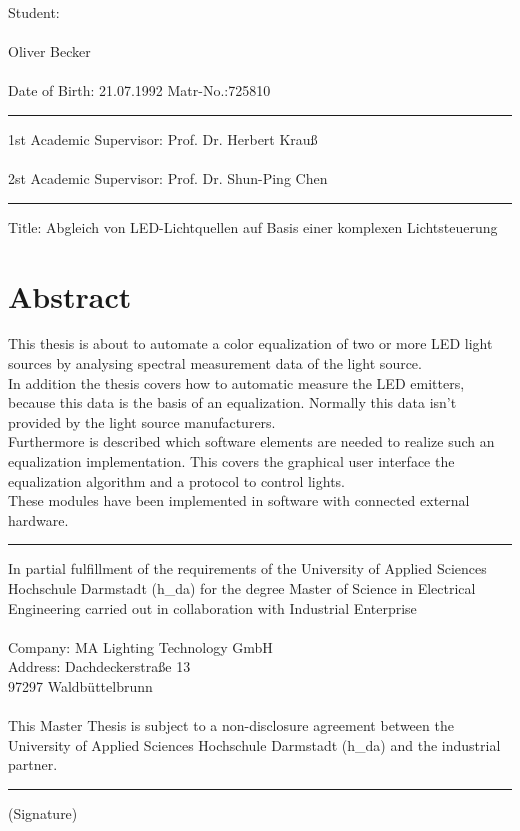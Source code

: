 \documentclass[11pt]{scrartcl}
\begin{document}
\noindent
Student:\\
\\
Oliver \hspace{6cm} Becker\\
\\
Date of Birth: 21.07.1992 \hspace{2.8cm} Matr-No.:725810
\par\noindent\rule{\textwidth}{0.4pt}
1st Academic Supervisor: Prof. Dr. Herbert Krauß\\
\\
2st Academic Supervisor: Prof. Dr. Shun-Ping Chen
\par\noindent\rule{\textwidth}{0.4pt}
Title: Abgleich von LED-Lichtquellen auf Basis einer komplexen Lichtsteuerung\\
\par\vspace{-0.8cm}\section*{Abstract}
This thesis is about to automate a color equalization of two or more LED light sources by analysing spectral
measurement data of the light source.\\
In addition the thesis covers how to automatic measure the LED emitters, because this data is the basis of an
equalization. Normally this data isn't provided by the light source manufacturers.\\
Furthermore is described which software elements are needed to realize such an equalization implementation.
This covers the graphical user interface the equalization algorithm and a protocol to control lights.\\
These modules have been implemented in software with connected external hardware.
\vspace{.6cm}
\par\noindent\rule{\textwidth}{0.4pt}
In partial fulfillment of the requirements of the University of Applied Sciences Hochschule
Darmstadt (h\_da) for the degree Master of Science in Electrical Engineering carried out in
collaboration with Industrial Enterprise\\
\\
Company:\hspace{0.45cm} MA Lighting Technology GmbH\\
Address:\hspace{0.7cm} Dachdeckerstraße 13\\
\hspace*{2.15cm} 97297 Waldbüttelbrunn\\
\\
This Master Thesis is subject to a non-disclosure agreement between the University of Applied 
Sciences Hochschule Darmstadt (h\_da) and the industrial partner.\\
\par\noindent\rule{\textwidth}{0.4pt}
(Signature)\\
\end{document}
